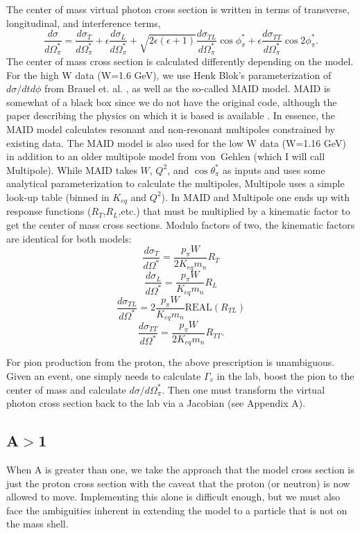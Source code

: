 The center of mass virtual photon cross section is written in terms of 
transverse, longitudinal, and interference terms,
$$
\frac{d\sigma}{d\Omega_{\pi}^{*}} = \frac{d\sigma_T}{d\Omega_{\pi}^{*}}+
\epsilon\frac{d\sigma_L}{d\Omega_{\pi}^{*}} + \sqrt{2\epsilon(\epsilon+1)}
 \frac{d\sigma_{TL}}{d\Omega_{\pi}^{*}}\cos{\phi_{\pi}^*} +
 \epsilon\frac{d\sigma_{TT}}{d\Omega_{\pi}^{*}}\cos{2\phi_{\pi}^{*}}.
$$
The center of mass cross section is calculated differently depending on 
the model.  For the high W data (W=1.6 GeV), we use Henk Blok's 
parameterization of $d\sigma/dtd\phi$ from Brauel et. al. \cite{Brauel}, as 
well as the so-called MAID model.  MAID is 
somewhat of a black box since we do not have the original code, although the 
paper describing the physics on which it is based is available \cite{Tiator}.
In essence, the MAID model calculates resonant and non-resonant multipoles
constrained by existing data.  The MAID model is also used for the low W
data (W=1.16 GeV) in addition to an older multipole model from von~Gehlen 
\cite{gehlen} (which I will call Multipole).  While MAID takes $W$, $Q^2$, and 
$\cos{\theta_{\pi}^*}$ as inputs and uses some analytical parameterization to 
calculate the multipoles, Multipole uses a simple look-up table (binned in 
$K_{eq}$ and $Q^2$).  In MAID and Multipole one ends up with response 
functions ($R_T$,$R_L$,etc.) that must be multiplied by a kinematic factor to 
get the center of mass cross sections.  Modulo factors of two, the kinematic 
factors are identical for both models:
$$
\frac{d\sigma_T}{d\Omega^*} = \frac{p_{\pi}W}{2K_{eq}m_n}R_T
$$
$$
\frac{d\sigma_L}{d\Omega^*} = \frac{p_{\pi}W}{K_{eq}m_n}R_L
$$
$$
\frac{d\sigma_{TL}}{d\Omega^*} = 2\frac{p_{\pi}W}{K_{eq}m_n}
{\textrm{REAL}}(R_{TL})
$$
$$
\frac{d\sigma_{TT}}{d\Omega^*} = \frac{p_{\pi}W}{2K_{eq}m_n}R_{TT}.
$$

For pion production from the proton, the above prescription is unambiguous.
Given an event, one simply needs to calculate $\Gamma_v$ in the lab, boost
the pion to the center of mass and calculate $d\sigma/d\Omega_{\pi}^*$.  Then
one must transform the virtual photon cross section back to the lab via a 
Jacobian (see Appendix A).

\subsection{A$>$1}
When A is greater than one, we take the approach that the model cross section
is just the proton cross section with the caveat that the proton (or neutron)
is now allowed to move.  Implementing this alone is difficult enough, but we 
must also face the ambiguities inherent in extending the model to a particle 
that is not on the mass shell.

